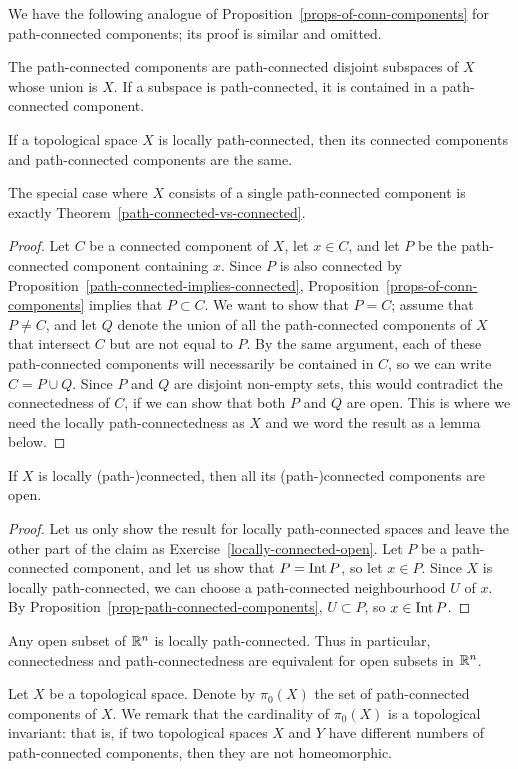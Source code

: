 We have the following analogue of Proposition~\ref{props-of-conn-components} for path-connected components; its proof is similar and omitted.
\begin{prop}
  \label{prop-path-connected-components}
  The path-connected components are path-connected disjoint subspaces of $X$ whose union is $X$. If a subspace is path-connected, it is contained in a path-connected component.
\end{prop}
\begin{thm}
  If a topological space $X$ is locally path-connected, then its connected components and path-connected components are the same.
\end{thm}
The special case where $X$ consists of a single path-connected component is exactly Theorem~\ref{path-connected-vs-connected}.
\begin{proof}
  Let $C$ be a connected component of $X$, let $x \in C$, and let $P$ be the path-connected component containing $x$. Since $P$ is also connected by Proposition~\ref{path-connected-implies-connected}, Proposition~\ref{props-of-conn-components} implies that $P \subset C$. We want to show that $P = C$; assume that $P \not= C$, and let $Q$ denote the union of all the path-connected components of $X$ that intersect $C$ but are not equal to $P$. By the same argument, each of these path-connected components will necessarily be contained in $C$, so we can write $C = P \cup Q$. Since $P$ and $Q$ are disjoint non-empty sets, this would contradict the connectedness of $C$, if we can show that both $P$ and $Q$ are open. This is where we need the locally path-connectedness as $X$ and we word the result as a lemma below.
\end{proof}
\begin{lem}
  If $X$ is locally (path-)connected, then all its (path-)connected components are open.
\end{lem}
\begin{proof}
  Let us only show the result for locally path-connected spaces and leave the other part of the claim as Exercise~\ref{locally-connected-open}. Let $P$ be a path-connected component, and let us show that $P = \operatorname{Int} P$, so let $x \in P$. Since $X$ is locally path-connected, we can choose a path-connected neighbourhood $U$ of $x$. By Proposition~\ref{prop-path-connected-components}, $U \subset P$, so $x \in \operatorname{Int} P$.
\end{proof}
\begin{example}
  Any open subset of $\mathbb{R}^n$ is locally path-connected. Thus in particular, connectedness and path-connectedness are equivalent for open subsets in $\mathbb{R}^n$.
\end{example}
\begin{rem}
  Let $X$ be a topological space. Denote by $\pi_0(X)$ the set of path-connected components of $X$. We remark that the cardinality of $\pi_0(X)$ is a topological invariant: that is, if two topological spaces $X$ and $Y$ have different numbers of path-connected components, then they are not homeomorphic.
\end{rem}
